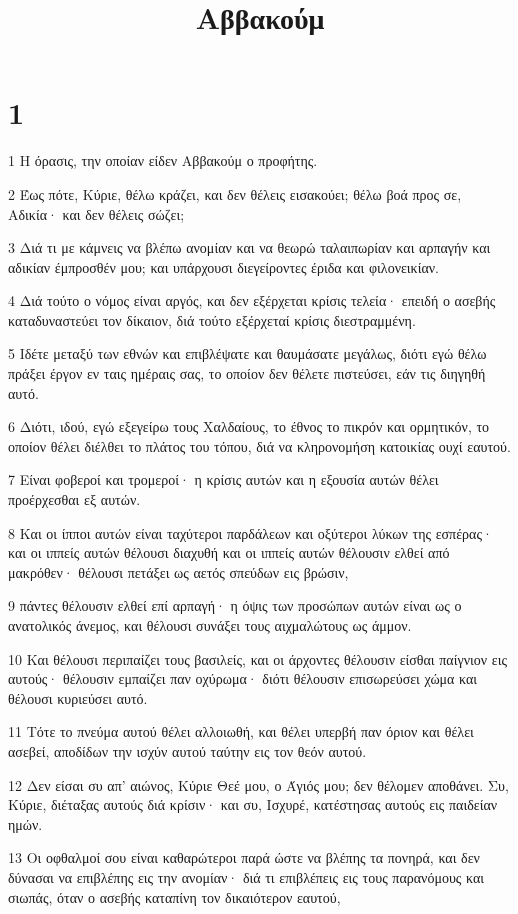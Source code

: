 

\title{Αββακούμ}


\chapter{1}

\par 1 Η όρασις, την οποίαν είδεν Αββακούμ ο προφήτης.
\par 2 Έως πότε, Κύριε, θέλω κράζει, και δεν θέλεις εισακούει; θέλω βοά προς σε, Αδικία· και δεν θέλεις σώζει;
\par 3 Διά τι με κάμνεις να βλέπω ανομίαν και να θεωρώ ταλαιπωρίαν και αρπαγήν και αδικίαν έμπροσθέν μου; και υπάρχουσι διεγείροντες έριδα και φιλονεικίαν.
\par 4 Διά τούτο ο νόμος είναι αργός, και δεν εξέρχεται κρίσις τελεία· επειδή ο ασεβής καταδυναστεύει τον δίκαιον, διά τούτο εξέρχεταί κρίσις διεστραμμένη.
\par 5 Ιδέτε μεταξύ των εθνών και επιβλέψατε και θαυμάσατε μεγάλως, διότι εγώ θέλω πράξει έργον εν ταις ημέραις σας, το οποίον δεν θέλετε πιστεύσει, εάν τις διηγηθή αυτό.
\par 6 Διότι, ιδού, εγώ εξεγείρω τους Χαλδαίους, το έθνος το πικρόν και ορμητικόν, το οποίον θέλει διέλθει το πλάτος του τόπου, διά να κληρονομήση κατοικίας ουχί εαυτού.
\par 7 Είναι φοβεροί και τρομεροί· η κρίσις αυτών και η εξουσία αυτών θέλει προέρχεσθαι εξ αυτών.
\par 8 Και οι ίπποι αυτών είναι ταχύτεροι παρδάλεων και οξύτεροι λύκων της εσπέρας· και οι ιππείς αυτών θέλουσι διαχυθή και οι ιππείς αυτών θέλουσιν ελθεί από μακρόθεν· θέλουσι πετάξει ως αετός σπεύδων εις βρώσιν,
\par 9 πάντες θέλουσιν ελθεί επί αρπαγή· η όψις των προσώπων αυτών είναι ως ο ανατολικός άνεμος, και θέλουσι συνάξει τους αιχμαλώτους ως άμμον.
\par 10 Και θέλουσι περιπαίζει τους βασιλείς, και οι άρχοντες θέλουσιν είσθαι παίγνιον εις αυτούς· θέλουσιν εμπαίζει παν οχύρωμα· διότι θέλουσιν επισωρεύσει χώμα και θέλουσι κυριεύσει αυτό.
\par 11 Τότε το πνεύμα αυτού θέλει αλλοιωθή, και θέλει υπερβή παν όριον και θέλει ασεβεί, αποδίδων την ισχύν αυτού ταύτην εις τον θεόν αυτού.
\par 12 Δεν είσαι συ απ' αιώνος, Κύριε Θεέ μου, ο Άγιός μου; δεν θέλομεν αποθάνει. Συ, Κύριε, διέταξας αυτούς διά κρίσιν· και συ, Ισχυρέ, κατέστησας αυτούς εις παιδείαν ημών.
\par 13 Οι οφθαλμοί σου είναι καθαρώτεροι παρά ώστε να βλέπης τα πονηρά, και δεν δύνασαι να επιβλέπης εις την ανομίαν· διά τι επιβλέπεις εις τους παρανόμους και σιωπάς, όταν ο ασεβής καταπίνη τον δικαιότερον εαυτού,
